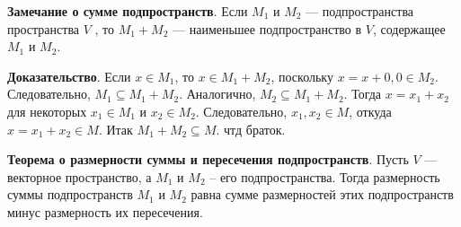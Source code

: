 \documentclass[a4paper]{article}
\begin{document}
    \begin{htheorem}
        \textbf{Замечание о сумме подпространств}. Если $M_1$ и $M_2$ –-- подпространства пространства $V$ , то $M_1 + M_2$ –--
        наименьшее подпространство в $V$, содержащее $M_1$ и $M_2$.
    \end{htheorem}


    \begin{hproof}
        \textbf{Доказательство}. Если $x \in M_1$, то $x \in M_1 + M_2$, поскольку $x = x + 0, 0 \in M_2$. Следовательно, $M_1 \subseteq M_1 + M_2$. Аналогично, $M_2 \subseteq M_1 + M_2$. Тогда $x = x_1 + x_2$ для некоторых $x_1 \in M_1$ и $x_2 \in M_2$. Следовательно, $x_1, x_2 \in M$, откуда $x=x_1+x_2 \in M$. Итак $M_1 + M_2 \subseteq M$. чтд браток.
    \end{hproof}


    \newpage \begin{center}
                 \begin{Large}
                 \end{Large}
    \end{center}
    
    \begin{htheorem}
        \textbf{Теорема о размерности суммы и пересечения подпространств}. Пусть $V$ --– векторное пространство, а $M_1$ и $M_2$ – его подпространства.
        Тогда размерность суммы подпространств $M_1$ и $M_2$ равна сумме размерностей этих подпространств минус размерность их пересечения.
    \end{htheorem}
\end{document}
